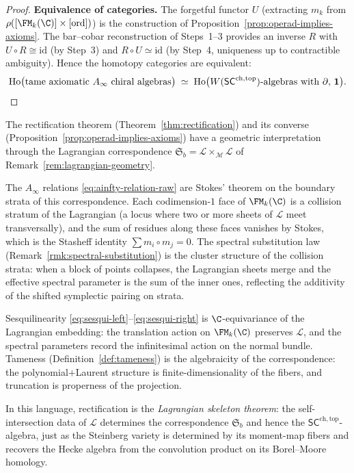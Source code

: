 \begin{proof}
\medskip
\textbf{Equivalence of categories.}
The forgetful functor $U$ (extracting $m_k$ from
$\rho([\FM_k(\C)] \times [\mathrm{ord}])$) is the construction of
Proposition~\ref{prop:operad-implies-axioms}. The bar--cobar
reconstruction of Steps~1--3 provides an inverse $R$ with
$U \circ R \cong \mathrm{id}$ (by Step~3) and
$R \circ U \simeq \mathrm{id}$ (by Step~4, uniqueness up to
contractible ambiguity). Hence the homotopy categories are
equivalent:
\[
 \mathrm{Ho}\bigl(\text{tame axiomatic }A_\infty\text{ chiral algebras}\bigr)
 \;\simeq\;
 \mathrm{Ho}\bigl(W(\mathsf{SC}^{\mathrm{ch,top}})\text{-algebras with
 }\partial,\,\mathbf{1}\bigr).
 \qedhere
\]
\end{proof}

\begin{remark}
\label{rem:lagrangian-skeleton}
The rectification theorem (Theorem~\ref{thm:rectification}) and
its converse (Proposition~\ref{prop:operad-implies-axioms}) have a
geometric interpretation through the Lagrangian correspondence
$\mathfrak{S}_b = \mathcal{L}\times_{\mathcal{M}}\mathcal{L}$
of Remark~\ref{rem:lagrangian-geometry}.

The $A_\infty$ relations \eqref{eq:ainfty-relation-raw} are
Stokes' theorem on the boundary strata of this correspondence.
Each codimension-$1$ face of $\FM_k(\C)$ is a collision stratum
of the Lagrangian (a locus where two or more sheets of
$\mathcal{L}$ meet transversally), and the sum of residues
along these faces vanishes by Stokes, which is the Stasheff
identity $\sum m_i\circ m_j = 0$. The spectral substitution
law (Remark~\ref{rmk:spectral-substitution}) is the cluster
structure of the collision strata: when a block of points
collapses, the Lagrangian sheets merge and the effective
spectral parameter is the sum of the inner ones, reflecting
the additivity of the shifted symplectic pairing on strata.

Sesquilinearity \eqref{eq:sesqui-left}--\eqref{eq:sesqui-right}
is $\C$-equivariance of the Lagrangian embedding: the translation
action on $\FM_k(\C)$ preserves $\mathcal{L}$, and the spectral
parameters record the infinitesimal action on the normal bundle.
Tameness (Definition~\ref{def:tameness}) is the algebraicity
of the correspondence: the polynomial$+$Laurent structure
is finite-dimensionality of the fibers, and truncation is
properness of the projection.

In this language, rectification is the \emph{Lagrangian skeleton
theorem}: the self-intersection data of $\mathcal{L}$
determines the correspondence $\mathfrak{S}_b$ and hence the
$\mathsf{SC}^{\mathrm{ch,top}}$-algebra, just as the
Steinberg variety is determined by its moment-map fibers
and recovers the Hecke algebra from the convolution product
on its Borel--Moore homology.
\end{remark}

